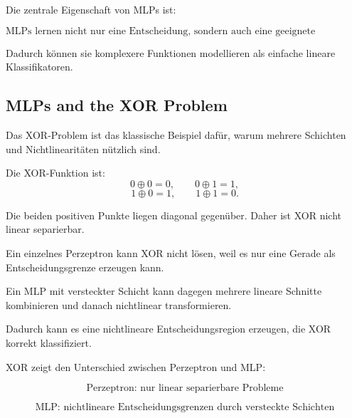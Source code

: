 \documentclass[11pt,a4paper]{scrartcl}
\begin{document}
\begin{answerbox}
    Die zentrale Eigenschaft von MLPs ist:

    \[
        \boxed{
            \text{MLPs lernen nicht nur eine Entscheidung, sondern auch eine
            geeignete Repräsentation der Eingabe.}
        }
    \]

    Dadurch können sie komplexere Funktionen modellieren als einfache lineare
    Klassifikatoren.
\end{answerbox}

\subsection{MLPs and the XOR Problem}

\begin{notebox}
    Das XOR-Problem ist das klassische Beispiel dafür, warum mehrere Schichten
    und Nichtlinearitäten nützlich sind.

    Die XOR-Funktion ist:
    \[
        0 \oplus 0 = 0,
        \qquad
        0 \oplus 1 = 1,
    \]
    \[
        1 \oplus 0 = 1,
        \qquad
        1 \oplus 1 = 0.
    \]

    Die beiden positiven Punkte liegen diagonal gegenüber. Daher ist XOR nicht
    linear separierbar.
\end{notebox}

\begin{solutionbox}
    Ein einzelnes Perzeptron kann XOR nicht lösen, weil es nur eine Gerade als
    Entscheidungsgrenze erzeugen kann.

    Ein MLP mit versteckter Schicht kann dagegen mehrere lineare Schnitte
    kombinieren und danach nichtlinear transformieren.

    Dadurch kann es eine nichtlineare Entscheidungsregion erzeugen, die XOR
    korrekt klassifiziert.
\end{solutionbox}

\begin{answerbox}
    XOR zeigt den Unterschied zwischen Perzeptron und MLP:

    \[
        \boxed{
            \text{Perzeptron: nur linear separierbare Probleme}
        }
    \]

    \[
        \boxed{
            \text{MLP: nichtlineare Entscheidungsgrenzen durch versteckte Schichten}
        }
    \]
\end{answerbox}
\end{document}
